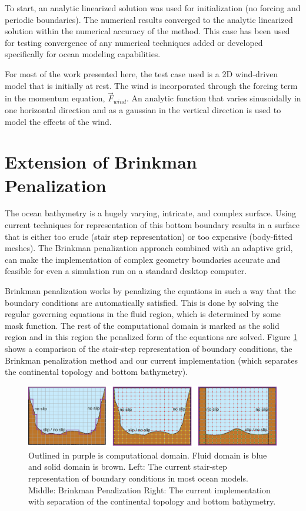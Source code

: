 To start, an analytic linearized solution was used for initialization (no forcing and periodic boundaries).  The numerical results converged to the analytic linearized solution within the numerical accuracy of the method.  This case has been used for testing convergence of any numerical techniques added or developed specifically for ocean modeling capabilities.

For most of the work presented here, the test case used is a 2D wind-driven model that is initially at rest.  The wind is incorporated through the forcing term in the momentum equation, $\vec{F}_{wind}$.  An analytic function that varies sinusoidally in one horizontal direction and as a gaussian in the vertical direction is used to model the effects of the wind.

\section{Extension of Brinkman Penalization}

The ocean bathymetry is a hugely varying, intricate, and complex surface.  Using current techniques for representation of this bottom boundary results in a surface that is either too crude (stair step representation) or too expensive (body-fitted meshes).  The Brinkman penalization approach combined with an adaptive grid, can make the implementation of complex geometry boundaries accurate and feasible for even a simulation run on a standard desktop computer.

Brinkman penalization works by penalizing the equations in such a way that the boundary conditions are automatically satisfied. This is done by solving the regular governing equations in the fluid region, which is determined by some mask function.  The rest of the computational domain is marked as the solid region and in this region the penalized form of the equations are solved.  Figure \ref{f:diagram} shows a comparison of the stair-step representation of boundary conditions, the Brinkman penalization method and our current implementation (which separates the continental topology and bottom bathymetry).

\begin{center}
\begin{figure}[htp]
\centering
  \includegraphics[width=6 in]{Images/diagram_all.eps}
  \caption[Schematic of Brinkman Penalization]{Outlined in purple is computational domain.  Fluid domain is blue and solid domain is brown.  Left: The current stair-step representation of boundary conditions in most ocean models.  Middle: Brinkman Penalization  Right: The current implementation with separation of the continental topology and bottom bathymetry.}\label{f:diagram}
\end{figure}
\end{center}

